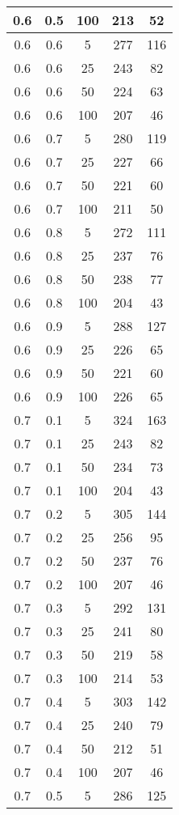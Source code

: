 \begin{appendices}
\begin{center}
\begin{longtable}[c]{|c|c|c|c|c|}
		\hline
		0.6& 0.5& 100& 213&  52\\
		\hline
		0.6& 0.6& 5& 277&  116\\
		\hline
		0.6& 0.6& 25& 243&  82\\
		\hline
		0.6& 0.6& 50& 224&  63\\
		\hline
		0.6& 0.6& 100& 207&  46\\
		\hline
		0.6& 0.7& 5& 280&  119\\
		\hline
		0.6& 0.7& 25& 227&  66\\
		\hline
		0.6& 0.7& 50& 221&  60\\
		\hline
		0.6& 0.7& 100& 211&  50\\
		\hline
		0.6& 0.8& 5& 272&  111\\
		\hline
		0.6& 0.8& 25& 237&  76\\
		\hline
		0.6& 0.8& 50& 238&  77\\
		\hline
		0.6& 0.8& 100& 204&  43\\
		\hline
		0.6& 0.9& 5& 288&  127\\
		\hline
		0.6& 0.9& 25& 226&  65\\
		\hline
		0.6& 0.9& 50& 221&  60\\
		\hline
		0.6& 0.9& 100& 226&  65\\
		\hline
		0.7& 0.1& 5& 324&  163\\
		\hline
		0.7& 0.1& 25& 243&  82\\
		\hline
		0.7& 0.1& 50& 234&  73\\
		\hline
		0.7& 0.1& 100& 204&  43\\
		\hline
		0.7& 0.2& 5& 305&  144\\
		\hline
		0.7& 0.2& 25& 256&  95\\
		\hline
		0.7& 0.2& 50& 237&  76\\
		\hline
		0.7& 0.2& 100& 207&  46\\
		\hline
		0.7& 0.3& 5& 292&  131\\
		\hline
		0.7& 0.3& 25& 241&  80\\
		\hline
		0.7& 0.3& 50& 219&  58\\
		\hline
		0.7& 0.3& 100& 214&  53\\
		\hline
		0.7& 0.4& 5& 303&  142\\
		\hline
		0.7& 0.4& 25& 240&  79\\
		\hline
		0.7& 0.4& 50& 212&  51\\
		\hline
		0.7& 0.4& 100& 207&  46\\
		\hline
		0.7& 0.5& 5& 286&  125\\
		\hline

\end{longtable}
\end{center}
\end{appendices}
